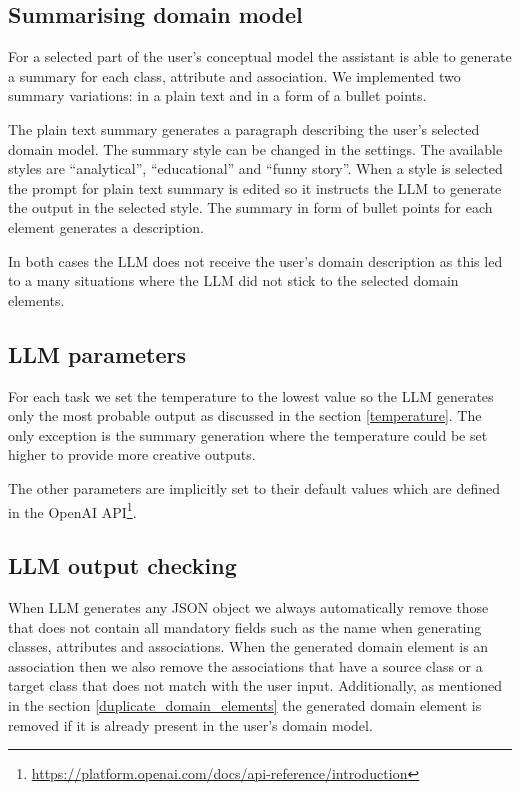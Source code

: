 \subsection{Summarising domain model}
\label{summarising_domain_model}

For a selected part of the user's conceptual model the assistant is able to generate a summary for each class, attribute and association. We implemented two summary variations: in a plain text and in a form of a bullet points.

The plain text summary generates a paragraph describing the user's selected domain model. The summary style can be changed in the settings. The available styles are ``analytical'', ``educational'' and ``funny story''. When a style is selected the prompt for plain text summary is edited so it instructs the LLM to generate the output in the selected style. The summary in form of bullet points for each element generates a description.

In both cases the LLM does not receive the user's domain description as this led to a many situations where the LLM did not stick to the selected domain elements.


\subsection{LLM parameters}

For each task we set the temperature to the lowest value so the LLM generates only the most probable output as discussed in the section \ref{temperature}. The only exception is the summary generation where the temperature could be set higher to provide more creative outputs.

The other parameters are implicitly set to their default values which are defined in the OpenAI API\footnote{\url{https://platform.openai.com/docs/api-reference/introduction}}.


\subsection{LLM output checking}

When LLM generates any JSON object we always automatically remove those that does not contain all mandatory fields such as the name when generating classes, attributes and associations. When the generated domain element is an association then we also remove the associations that have a source class or a target class that does not match with the user input. Additionally, as mentioned in the section \ref{duplicate_domain_elements} the generated domain element is removed if it is already present in the user's domain model.


